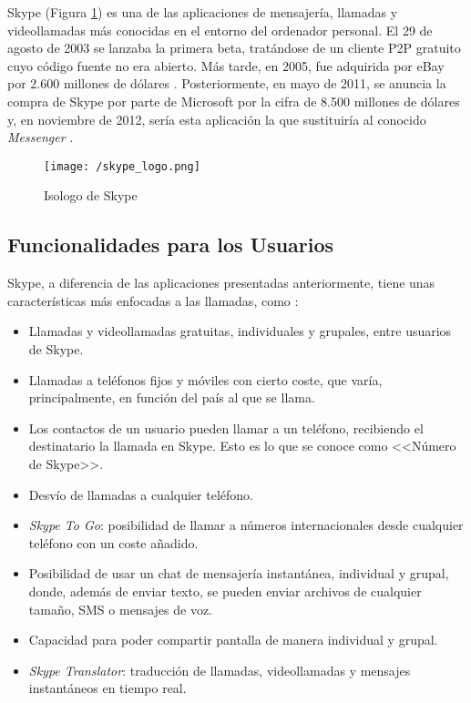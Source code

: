 Skype (Figura \ref{fig:skype}) es una de las aplicaciones de mensajería, llamadas y videollamadas más conocidas en el entorno del ordenador personal.
El 29 de agosto de 2003 se lanzaba la primera beta, tratándose de un cliente \acf{P2P} gratuito cuyo código fuente no era abierto. Más tarde, en 2005, fue adquirida por eBay por 2.600 millones de dólares \cite{Velasco2013}. Posteriormente, en mayo de 2011, se anuncia la compra de Skype por parte de Microsoft por la cifra de 8.500 millones de dólares y, en noviembre de 2012, sería esta aplicación la que sustituiría al conocido \textit{Messenger} \cite{Ramirez2013}.

\begin{figure}[!h]
	\begin{center}
		\texttt{[image: /skype\_logo.png]}
		\caption{Isologo de Skype}
		\label{fig:skype}
	\end{center}
\end{figure}

\subsection{Funcionalidades para los Usuarios}
Skype, a diferencia de las aplicaciones presentadas anteriormente, tiene unas características más enfocadas a las llamadas, como \cite{Skype2017}:

\begin{itemize}
	\item Llamadas y videollamadas gratuitas, individuales y grupales, entre usuarios de Skype.
	\item Llamadas a teléfonos fijos y móviles con cierto coste, que varía, principalmente, en función del país al que se llama.
	\item Los contactos de un usuario pueden llamar a un teléfono, recibiendo el destinatario la llamada en Skype. Esto es lo que se conoce como <<Número de Skype>>.
	\item Desvío de llamadas a cualquier teléfono.
	\item \textit{Skype To Go}: posibilidad de llamar a números internacionales desde cualquier teléfono con un coste añadido.
	\item Posibilidad de usar un chat de mensajería instantánea, individual y grupal, donde, además de enviar texto, se pueden enviar archivos de cualquier tamaño, \acs{SMS} o mensajes de voz.
	\item Capacidad para poder compartir pantalla de manera individual y grupal.
	\item \textit{Skype Translator}: traducción de llamadas, videollamadas y mensajes instantáneos en tiempo real.
\end{itemize}

